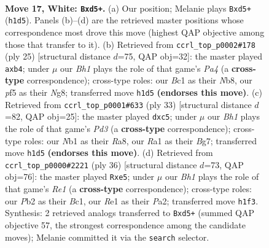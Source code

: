 \documentclass[11pt]{article}
\begin{document}
\clearpage

\begin{figure}[p]\centering
\begin{subfigure}{0.46\textwidth}\centering
\resizebox{\linewidth}{!}{%
\newchessgame
\chessboard[
  setfen={r1b2rk1/pp5p/6p1/2pnbp1n/7P/4P1P1/PP1P1P2/RNB1RK1B w - - 0 17},
  showmover=false,
  pgfstyle=straightmove, color=movearrow, markmove={h1-d5}
]}
\caption{}
\end{subfigure}\hfill
\begin{subfigure}{0.46\textwidth}\centering
\resizebox{\linewidth}{!}{%
\newchessgame
\chessboard[
  setfen={rn2k1nr/1p1b1ppp/2p5/p2pP3/1N1N1P2/7P/P2P2P1/R1B1KB1R b KQkq - 0 13},
  showmover=false,
  pgfstyle=straightmove, color=movearrow, markmove={a5-b4}
]}
\caption{}
\end{subfigure}
\\[4pt]
\begin{subfigure}{0.46\textwidth}\centering
\resizebox{\linewidth}{!}{%
\newchessgame
\chessboard[
  setfen={r1b1k2r/pp2ppbp/3p2p1/1PB5/2N5/6P1/P3PPBP/1R3RK1 b kq - 0 17},
  showmover=false,
  pgfstyle=straightmove, color=movearrow, markmove={d6-c5}
]}
\caption{}
\end{subfigure}\hfill
\begin{subfigure}{0.46\textwidth}\centering
\resizebox{\linewidth}{!}{%
\newchessgame
\chessboard[
  setfen={r1r3k1/p3pp1p/2p3p1/N1pnbb2/8/2P4P/PP1P1PP1/R1B1R1K1 w - - 0 19},
  showmover=false,
  pgfstyle=straightmove, color=movearrow, markmove={e1-e5}
]}
\caption{}
\end{subfigure}
\caption{\textbf{Move 17, White: \texttt{Bxd5+}.} (a) Our position; Melanie plays \texttt{Bxd5+} (\texttt{h1d5}). Panels (b)--(d) are the retrieved master positions whose correspondence most drove this move (highest QAP objective among those that transfer to it). (b) Retrieved from \texttt{ccrl\_top\_p0002\#178} (ply 25) [structural distance $d$=75, QAP obj=32]: the master played \texttt{axb4}; under $\mu$ our \emph{Bh1} plays the role of that game's \emph{Pa4} (a \textbf{cross-type} correspondence); cross-type roles: our \emph{B}c1 as their \emph{N}b8, our \emph{p}f5 as their \emph{N}g8; transferred move \texttt{h1d5} \textbf{(endorses this move)}. (c) Retrieved from \texttt{ccrl\_top\_p0001\#633} (ply 33) [structural distance $d$=82, QAP obj=25]: the master played \texttt{dxc5}; under $\mu$ our \emph{Bh1} plays the role of that game's \emph{Pd3} (a \textbf{cross-type} correspondence); cross-type roles: our \emph{N}b1 as their \emph{R}a8, our \emph{R}a1 as their \emph{B}g7; transferred move \texttt{h1d5} \textbf{(endorses this move)}. (d) Retrieved from \texttt{ccrl\_top\_p0000\#2221} (ply 36) [structural distance $d$=73, QAP obj=76]: the master played \texttt{Rxe5}; under $\mu$ our \emph{Bh1} plays the role of that game's \emph{Re1} (a \textbf{cross-type} correspondence); cross-type roles: our \emph{P}b2 as their \emph{B}c1, our \emph{R}e1 as their \emph{P}a2; transferred move \texttt{h1f3}. Synthesis: 2 retrieved analogs transferred to \texttt{Bxd5+} (summed QAP objective 57, the strongest correspondence among the candidate moves); Melanie committed it via the \texttt{search} selector.}
\label{fig:thought-m32}
\end{figure}
\end{document}
